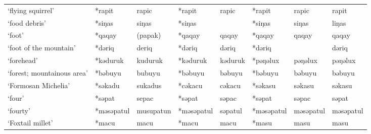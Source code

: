 \begin{landscape}
\begin{longtable}[c]{@{}p{3cm}<{\raggedright}p{2.75cm}<{\raggedright}p{2.75cm}<{\raggedright}p{2.75cm}<{\raggedright}p{2.75cm}<{\raggedright}p{2.75cm}<{\raggedright}p{2.75cm}<{\raggedright}p{2.75cm}<{\raggedright}@{}}
`flying squirrel'                                    & *rapit             & rapic                          & *rapit             & rapic                      & *rapit           & rapic                    & rapit                             \\
`food debris'                                        & *siŋas             & siŋas                          & *siŋas             &                            & *siŋas           & siŋas                    & liŋas                             \\
`foot'                                               & *qaqay             & (papak)                        & *qaqay             & qaqay                      & *qaqay           & qaqay                    & qaqay                             \\
`foot of the mountain'                               & *dəriq             & deriq                          & *dəriq             & dəriq                      & *dəriq           &                          & dəriq                             \\
`forehead'                                           & *kəduruk           & kuduruk                        & *kəduruk           & kəduruk                    & *pəŋəlux         & pəŋəlux                  & pəŋəlux                           \\
`forest; mountainous area'                           & *bəbuyu            & bubuyu                         & *bəbuyu            & bəbuyu                     & *bəbuyu          & bəbuyu                   & bəbuyu                            \\
`Formosan Michelia'                                  & *səkadu            & sukadus                        & *cəkacu            & cəkacu                     & *səkasu          & səkasu                   & səkasu                            \\
`four'                                               & *səpat             & sepac                          & *səpat             & səpac                      & *səpat           & səpac                    & səpat                             \\
`fourty'                                             & *məsəpatul         & musupatun                      & *məsəpatul         & səpatul                    & *məsəpatul       & məsəpatul                & məsəpatul                         \\
`Foxtail millet'                                     & *macu              & macu                           & *macu              & macu                       & *masu            & masu                     & masu                              \\

\end{longtable}
\end{landscape}
